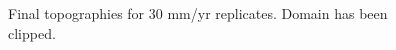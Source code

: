 \documentclass[a4paper]{article}
\begin{document}
\begin{appendices}
\begin{figure}[!ht]
	\caption{Final topographies for 30 mm/yr replicates. Domain has been clipped.}
	\label{fig:030topo}
\end{figure}


\end{appendices}
\end{document}
